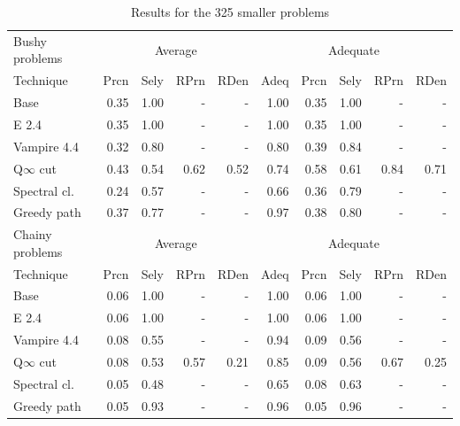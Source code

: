 \documentclass[EPiC]{easychair}
\begin{document}
\begin{table}[hbt]
\begin{center}
\begin{tabular}{|l|rrrr|r|rrrr|}
\hline
Bushy problems  & \multicolumn{4}{|c|}{Average} & \multicolumn{5}{|c|}{Adequate} \\
Technique       & Prcn & Sely & RPrn & RDen & Adeq & Prcn & Sely & RPrn & RDen \\
\hline
Base            & 0.35 & 1.00 &  -   &  -   & 1.00 & 0.35 & 1.00 &  -   &  -   \\
E 2.4           & 0.35 & 1.00 &  -   &  -   & 1.00 & 0.35 & 1.00 &  -   &  -   \\
Vampire 4.4     & 0.32 & 0.80 &  -   &  -   & 0.80 & 0.39 & 0.84 &  -   &  -   \\
Q$\infty$ cut   & 0.43 & 0.54 & 0.62 & 0.52 & 0.74 & 0.58 & 0.61 & 0.84 & 0.71 \\
Spectral cl.    & 0.24 & 0.57 &  -   &  -   & 0.66 & 0.36 & 0.79 &  -   &  -   \\
Greedy path     & 0.37 & 0.77 &  -   &  -   & 0.97 & 0.38 & 0.80 &  -   &  -   \\
\hline
Chainy problems & \multicolumn{4}{|c|}{Average} & \multicolumn{5}{|c|}{Adequate} \\
Technique       & Prcn & Sely & RPrn & RDen & Adeq & Prcn & Sely & RPrn & RDen \\
\hline
Base            & 0.06 & 1.00 &  -   &  -   & 1.00 & 0.06 & 1.00 &  -   &  -   \\
E 2.4           & 0.06 & 1.00 &  -   &  -   & 1.00 & 0.06 & 1.00 &  -   &  -   \\
Vampire 4.4     & 0.08 & 0.55 &  -   &  -   & 0.94 & 0.09 & 0.56 &  -   &  -   \\
Q$\infty$ cut   & 0.08 & 0.53 & 0.57 & 0.21 & 0.85 & 0.09 & 0.56 & 0.67 & 0.25 \\
Spectral cl.    & 0.05 & 0.48 &  -   &  -   & 0.65 & 0.08 & 0.63 &  -   &  -   \\
Greedy path     & 0.05 & 0.93 &  -   &  -   & 0.96 & 0.05 & 0.96 &  -   &  -   \\
\hline
\end{tabular}
\caption{Results for the 325 smaller problems}
\label{Results325}
\end{center}
\end{table}
\end{document}
